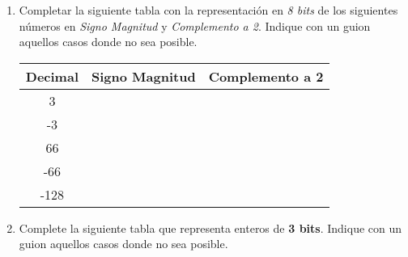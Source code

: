 \documentclass[12pt]{article}
\begin{document}
\begin{enumerate}
\begin{center}
\begin{tabular}[t]{|c|c|c|}
        \hline

        \end{tabular}

    \end{center}

\item Completar la siguiente tabla con la representación en \emph{8 bits} de
    los siguientes números en \emph{Signo Magnitud} y \emph{Complemento a 2}.
    Indique con un guion aquellos casos donde no sea posible.

    \begin{center}

        \begin{tabular}[t]{|c|c|c|}

        \hline

            \textbf{Decimal} & \textbf{Signo Magnitud} & \textbf{Complemento a
            2}\\

        \hline

            3 & \hspace{14em}~&\hspace{14em}~\\

        \hline

            -3&&\\

        \hline

            66&&\\

        \hline

            -66&&\\

        \hline

            -128&&\\

        \hline

        \end{tabular}

    \end{center}

    \item Complete la siguiente tabla que representa enteros de \textbf{3
        bits}. Indique con un guion aquellos casos donde no sea posible.

        \begin{center}

            \begin{tabular}[t]{|c|c|c|c|}


\end{tabular}
\end{center}
\end{enumerate}
\end{document}
